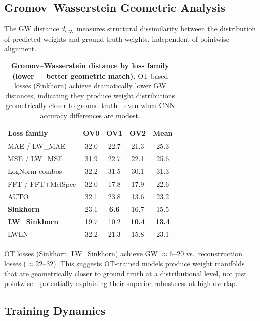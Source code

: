 \subsection{Gromov--Wasserstein Geometric Analysis}

The GW distance $d_{\text{GW}}$ measures structural dissimilarity between the distribution of predicted weights and ground-truth weights, independent of pointwise alignment.

\begin{table}[h]
\centering\small
\begin{tabular}{lcccc}
\hline
\textbf{Loss family} & \textbf{OV0} & \textbf{OV1} & \textbf{OV2} & \textbf{Mean} \\
\hline
MAE / LW\_MAE       & 32.0 & 22.7 & 21.3 & 25.3 \\
MSE / LW\_MSE       & 31.9 & 22.7 & 22.1 & 25.6 \\
LogNorm combos       & 32.2 & 31.5 & 30.1 & 31.3 \\
FFT / FFT+MelSpec    & 32.0 & 17.8 & 17.9 & 22.6 \\
AUTO                 & 32.1 & 23.8 & 13.6 & 23.2 \\
\textbf{Sinkhorn}   & 23.1 & \textbf{6.6}  & 16.7 & 15.5 \\
\textbf{LW\_Sinkhorn} & 19.7 & 10.2 & \textbf{10.4} & \textbf{13.4} \\
LWLN                 & 32.2 & 21.3 & 15.8 & 23.1 \\
\hline
\end{tabular}
\caption{\textbf{Gromov--Wasserstein distance by loss family (lower = better geometric match).} OT-based losses (Sinkhorn) achieve dramatically lower GW distances, indicating they produce weight distributions geometrically closer to ground truth---even when CNN accuracy differences are modest.}
\label{tab:gw}
\end{table}

OT losses (Sinkhorn, LW\_Sinkhorn) achieve GW $\approx 6$--$20$ vs.\ reconstruction losses ($\approx 22$--$32$). This suggests OT-trained models produce weight manifolds that are geometrically closer to ground truth at a distributional level, not just pointwise---potentially explaining their superior robustness at high overlap.

\subsection{Training Dynamics}


